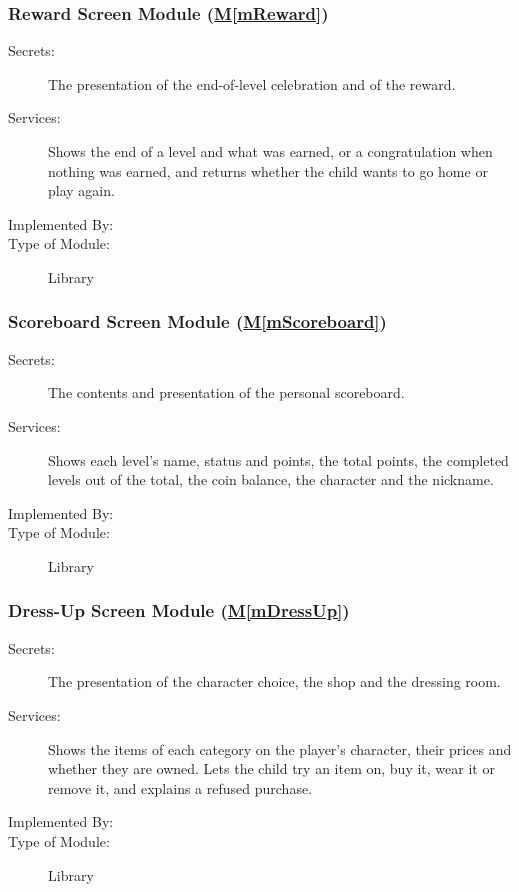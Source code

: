 \documentclass[12pt, titlepage]{article}
\newcommand{\mref}[1]{\hyperref[#1]{M\ref*{#1}}}
\begin{document}
\subsubsection{Reward Screen Module (\mref{mReward})}

\begin{description}
\item[Secrets:] The presentation of the end-of-level celebration and of the
  reward.
\item[Services:] Shows the end of a level and what was earned, or a
  congratulation when nothing was earned, and returns whether the child wants
  to go home or play again.
\item[Implemented By:] \progname{}
\item[Type of Module:] Library
\end{description}

\subsubsection{Scoreboard Screen Module (\mref{mScoreboard})}

\begin{description}
\item[Secrets:] The contents and presentation of the personal scoreboard.
\item[Services:] Shows each level's name, status and points, the total points,
  the completed levels out of the total, the coin balance, the character and
  the nickname.
\item[Implemented By:] \progname{}
\item[Type of Module:] Library
\end{description}

\subsubsection{Dress-Up Screen Module (\mref{mDressUp})}

\begin{description}
\item[Secrets:] The presentation of the character choice, the shop and the
  dressing room.
\item[Services:] Shows the items of each category on the player's character,
  their prices and whether they are owned. Lets the child try an item on, buy
  it, wear it or remove it, and explains a refused purchase.
\item[Implemented By:] \progname{}
\item[Type of Module:] Library
\end{description}
\end{document}
